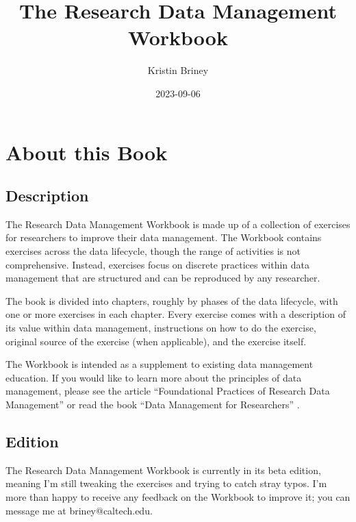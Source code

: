\documentclass[
]{book}
\title{The Research Data Management Workbook}
\author{Kristin Briney}
\date{2023-09-06}
\begin{document}
\maketitle

{
\setcounter{tocdepth}{1}
\tableofcontents
}
\hypertarget{about-this-book}{%
\chapter*{About this Book}\label{about-this-book}}

\hypertarget{description}{%
\section*{Description}\label{description}}

The Research Data Management Workbook is made up of a collection of exercises for researchers to improve their data management. The Workbook contains exercises across the data lifecycle, though the range of activities is not comprehensive. Instead, exercises focus on discrete practices within data management that are structured and can be reproduced by any researcher.

The book is divided into chapters, roughly by phases of the data lifecycle, with one or more exercises in each chapter. Every exercise comes with a description of its value within data management, instructions on how to do the exercise, original source of the exercise (when applicable), and the exercise itself.

The Workbook is intended as a supplement to existing data management education. If you would like to learn more about the principles of data management, please see the article ``Foundational Practices of Research Data Management'' \citep{briney_foundational_2020} or read the book ``Data Management for Researchers'' \citep{briney_data_2015}.

\hypertarget{edition}{%
\section*{Edition}\label{edition}}

The Research Data Management Workbook is currently in its beta edition, meaning I'm still tweaking the exercises and trying to catch stray typos. I'm more than happy to receive any feedback on the Workbook to improve it; you can message me at briney@caltech.edu.
\end{document}
